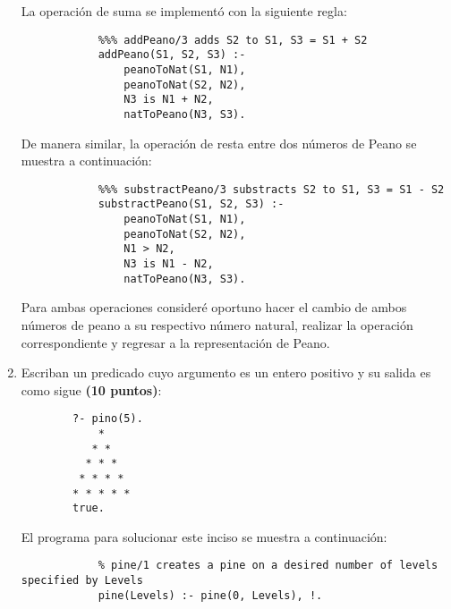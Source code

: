 \begin{enumerate}
\begin{solution}
        La operación de suma se implementó con la siguiente regla:
        \begin{verbatim}
            %%% addPeano/3 adds S2 to S1, S3 = S1 + S2
            addPeano(S1, S2, S3) :-
                peanoToNat(S1, N1),
                peanoToNat(S2, N2),
                N3 is N1 + N2,
                natToPeano(N3, S3).
        \end{verbatim}
        De manera similar, la operación de resta entre dos números de Peano se muestra a continuación:
        \begin{verbatim}
            %%% substractPeano/3 substracts S2 to S1, S3 = S1 - S2
            substractPeano(S1, S2, S3) :-
                peanoToNat(S1, N1),
                peanoToNat(S2, N2),
                N1 > N2,
                N3 is N1 - N2,
                natToPeano(N3, S3).
        \end{verbatim}
        Para ambas operaciones consideré oportuno hacer el cambio de ambos números de peano a su respectivo número natural, realizar la operación correspondiente y regresar a la representación de Peano.
    \end{solution}
    \item Escriban un predicado  cuyo argumento es un entero positivo y su salida es como sigue \textbf{(10 puntos)}:
    \begin{verbatim}
        ?- pino(5).
            *
           * *
          * * *
         * * * *
        * * * * *
        true.
    \end{verbatim}
    \begin{solution}
        El programa para solucionar este inciso se muestra a continuación:
        \begin{verbatim}
            % pine/1 creates a pine on a desired number of levels specified by Levels
            pine(Levels) :- pine(0, Levels), !.


\end{verbatim}
\end{solution}
\end{enumerate}
